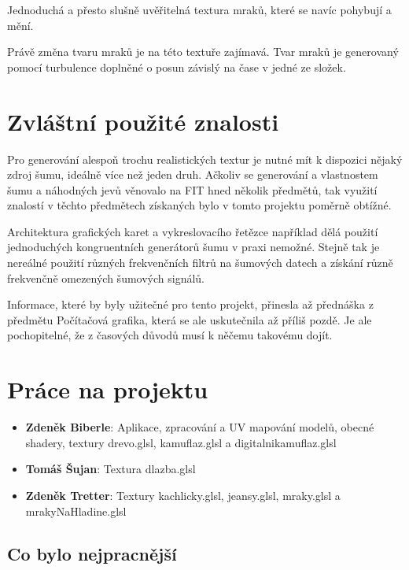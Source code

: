 \documentclass[12pt,a4paper,titlepage,final]{report}
\newcommand\AuthorA{Zdeněk Biberle}
\newcommand\AuthorB{Tomáš Šujan}
\newcommand\AuthorC{Zdeněk Tretter}
\begin{document}
Jednoduchá a přesto slušně uvěřitelná textura mraků, které se navíc pohybují a mění. 

Právě změna tvaru mraků je  na této textuře zajímavá. Tvar mraků je generovaný pomocí turbulence doplněné o posun závislý na čase v jedné ze složek.
  


\chapter{Zvláštní použité znalosti}
Pro generování alespoň trochu realistických textur je nutné mít k dispozici nějaký zdroj šumu, ideálně více než jeden druh. Ačkoliv se generování a vlastnostem šumu a náhodných jevů věnovalo na FIT hned několik předmětů, tak využití znalostí v těchto předmětech získaných bylo v tomto projektu poměrně obtížné. 

Architektura grafických karet a vykreslovacího řetězce například dělá použití jednoduchých kongruentních generátorů šumu v praxi nemožné. Stejně tak je nereálné použití různých frekvenčních filtrů na šumových datech a získání různě frekvenčně omezených šumových signálů.

Informace, které by byly užitečné pro tento projekt, přinesla až přednáška z předmětu Počítačová grafika, která se ale uskutečnila až příliš pozdě. Je ale pochopitelné, že z časových důvodů musí k něčemu takovému dojít.

\chapter{Práce na projektu}

\begin{itemize}
\item \textbf{\AuthorA}: Aplikace, zpracování a UV mapování modelů, obecné shadery, textury drevo.glsl, kamuflaz.glsl a digitalnikamuflaz.glsl
\item \textbf{\AuthorB}: Textura dlazba.glsl
\item \textbf{\AuthorC}: Textury kachlicky.glsl, jeansy.glsl, mraky.glsl a mrakyNaHladine.glsl
\end{itemize}

\section{Co bylo nejpracnější}
\end{document}
